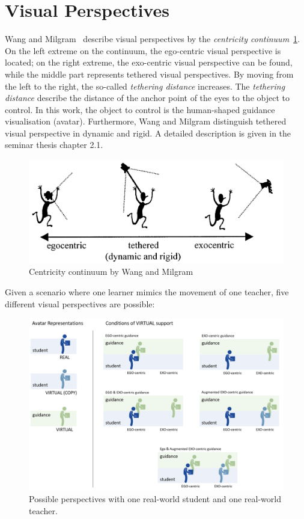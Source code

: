 \section{Visual Perspectives}
\label{section:visual_perspectives}
Wang and Milgram~\cite{centricitycontinuum} describe visual perspectives by the \textit{centricity continuum}~\ref{fig:ego-exo-continuum}. On the left extreme on the continuum, the ego-centric visual perspective is located; on the right extreme, the exo-centric visual perspective can be found, while the middle part represents tethered visual perspectives. By moving from the left to the right, the so-called \textit{tethering distance} increases. The \textit{tethering distance} describe the distance of the anchor point of the eyes to the object to control. In this work, the object to control is the human-shaped guidance visualisation (avatar). Furthermore, Wang and Milgram distinguish tethered visual perspective in dynamic and rigid. A detailed description is given in the seminar thesis chapter 2.1. 
\begin{figure}[htb]
	\centering
	\includegraphics[width=\textwidth]{figures/ego_exo_continuum.PNG}
	\caption[Centricity continuum]{Centricity continuum by Wang and Milgram~\cite{centricitycontinuum}}
	\label{fig:ego-exo-continuum}
\end{figure}
Given a scenario where one learner mimics the movement of one teacher, five different visual perspectives are possible:
\begin{figure}[htb]
	\centering
	\includegraphics[width=\textwidth]{figures/perspectives.png}
	\caption[Possible perspectives]{Possible perspectives with one real-world student and one real-world teacher.}
	\label{fig:perspectives}
\end{figure}
